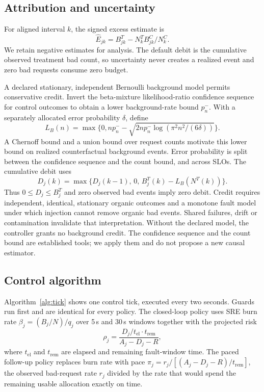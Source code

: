 \documentclass[a4paper,fleqn,11pt]{cas-dc}
\begin{document}
\subsection{Attribution and uncertainty}
For aligned interval $k$, the signed excess estimate is
\begin{equation}
 \widehat E_{jk}=B^T_{jk}-N^T_k B^C_{jk}/N^C_k.
\end{equation}
We retain negative estimates for analysis. The default debit is the cumulative observed treatment bad count, so uncertainty never creates a realized event and zero bad requests consume zero budget.

A declared stationary, independent Bernoulli background model permits conservative credit. Invert the beta-mixture likelihood-ratio confidence sequence for control outcomes \citep{howard2021timeuniform} to obtain a lower background-rate bound $p^-_n$. With a separately allocated error probability $\delta$, define
\begin{equation}
 L_B(n)=\max\{0,np^-_n-\sqrt{2np^-_n\log(\pi^2n^2/(6\delta))}\}.
\end{equation}
A Chernoff bound and a union bound over request counts motivate this lower bound on realized counterfactual background events. Error probability is split between the confidence sequence and the count bound, and across SLOs. The cumulative debit uses
\begin{equation}
 D_j(k)=\max\{D_j(k-1),\,0,\,B^T_j(k)-L_B(N^T(k))\}.
\end{equation}
Thus $0\leq D_j\leq B^T_j$ and zero observed bad events imply zero debit. Credit requires independent, identical, stationary organic outcomes and a monotone fault model under which injection cannot remove organic bad events. Shared failures, drift or contamination invalidate that interpretation. Without the declared model, the controller grants no background credit. The confidence sequence and the count bound are established tools; we apply them and do not propose a new causal estimator.

\subsection{Control algorithm}
Algorithm~\ref{alg:tick} shows one control tick, executed every two seconds. Guards run first and are identical for every policy. The closed-loop policy uses SRE burn rate $\beta_j=(B_j/N)/q_j$ over 5\,s and 30\,s windows together with the projected risk
\begin{equation}
\rho_j=\frac{D_j/t_{\text{el}}\cdot t_{\text{rem}}}{A_j-D_j-R},
\end{equation}
where $t_{\text{el}}$ and $t_{\text{rem}}$ are elapsed and remaining fault-window time. The paced follow-up policy replaces burn rate with pace $\pi_j=r_j/[(A_j-D_j-R)/t_{\text{rem}}]$, the observed bad-request rate $r_j$ divided by the rate that would spend the remaining usable allocation exactly on time.
\end{document}
